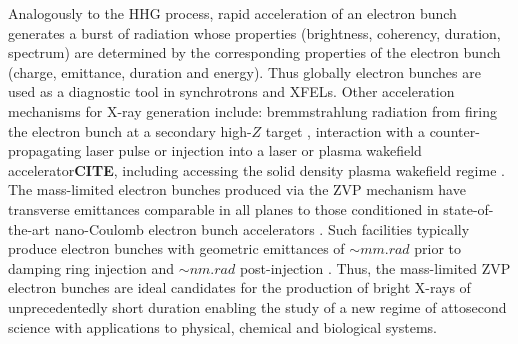 Analogously to the \ac{HHG} process, rapid acceleration of an electron bunch generates a burst of radiation whose properties (brightness, coherency, duration, spectrum) are determined by the corresponding properties of the electron bunch (charge, emittance, duration and energy). Thus globally electron bunches are used as a diagnostic tool in synchrotrons and XFELs. Other acceleration mechanisms for X-ray generation include: bremmstrahlung radiation from firing the electron bunch at a secondary high-$Z$ target \cite{cordeFemtosecondRaysLaserplasma2013}, interaction with a counter-propagating laser pulse \cite{khrennikovTunableAllOpticalQuasimonochromatic2015,kulaginNonlinearReflectionHighamplitude2016} or injection into a laser or plasma wakefield accelerator\textbf{CITE}, including accessing the solid density plasma wakefield regime \cite{linIsolatedAttosecondElectron2020}. The mass-limited electron bunches produced via the ZVP mechanism have transverse emittances comparable in all planes to those conditioned in state-of-the-art nano-Coulomb electron bunch accelerators \cite{martinDiamondLightSource2020,pingProgressHEPSProject2020}. Such facilities typically produce electron bunches with geometric emittances of $\sim \unit{mm.rad}$ prior to damping ring injection \cite{christouPreInjectorLinacDiamond2004} and $\sim \unit{nm.rad}$ post-injection \cite{martinDiamondLightSource2020}. Thus, the mass-limited ZVP electron bunches are ideal candidates for the production of bright X-rays of unprecedentedly short duration enabling the study of a new regime of attosecond science with applications to physical, chemical and biological systems.


